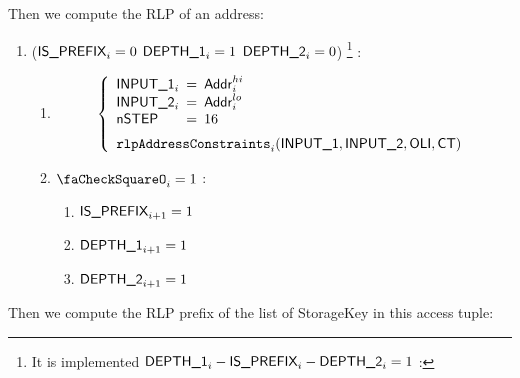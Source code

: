 Then we compute the RLP of an address:
\begin{enumerate}[resume]
	\item \If ($\textsf{IS\_PREFIX}_{i}=0$ \et $\textsf{DEPTH\_1}_{i}=1$ \et $\textsf{DEPTH\_2}_{i}=0$) \footnote{It is implemented \If  $\textsf{DEPTH\_1}_{i} - \textsf{IS\_PREFIX}_{i} - \textsf{DEPTH\_2}_{i}=1$ \Then:} \Then:
		\begin{enumerate}
			\item
				\[
					\left\{
						\begin{array}{lcl}
							\Input1_{i} & \!\!\! = \!\!\! & \col{Addr}^{hi}_{i} \\
							\Input2_{i} & \!\!\! = \!\!\! & \col{Addr}^{lo}_{i} \\
							\nbstep & \!\!\! = \!\!\! & 16 \vspace{2mm} \\
							\multicolumn{3}{l}{\texttt{rlpAddressConstraints}_{i}(\Input1, \Input2, \oli, \ct)} \\
						\end{array}
						\right.
					\]
				\item \If $\done_{i}=1$ \Then:
					\begin{enumerate}
						\item $\textsf{IS\_PREFIX}_{i+1}=1$
						\item $\textsf{DEPTH\_1}_{i+1}=1$
						\item $\textsf{DEPTH\_2}_{i+1}=1$
					\end{enumerate}
		\end{enumerate}
\end{enumerate}
Then we compute the RLP prefix of the list of StorageKey in this access tuple:
